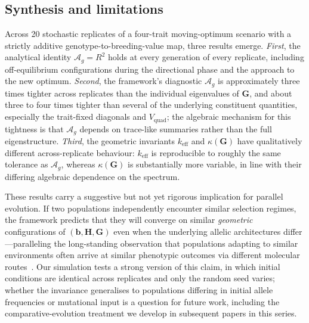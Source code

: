 \documentclass[9pt,twocolumn,twoside,lineno]{gsajnl}
\newcommand{\vect}[1]{\boldsymbol{#1}}
\newcommand{\mat}[1]{\mathbf{#1}}
\newcommand{\Ag}{\ensuremath{\mathcal{A}_{g}}\xspace}
\newcommand{\Vquad}{\ensuremath{V_{\text{quad}}}\xspace}
\newcommand{\keff}{\ensuremath{k_{\mathrm{eff}}}\xspace}
\begin{document}
\subsection*{Synthesis and limitations}

Across 20 stochastic replicates of a four-trait moving-optimum scenario with a strictly additive genotype-to-breeding-value map, three results emerge. \emph{First}, the analytical identity $\Ag = R^2$ holds at every generation of every replicate, including off-equilibrium configurations during the directional phase and the approach to the new optimum. \emph{Second}, the framework's diagnostic \Ag is approximately three times tighter across replicates than the individual eigenvalues of $\mat{G}$, and about three to four times tighter than several of the underlying constituent quantities, especially the trait-fixed diagonals and $\Vquad$; the algebraic mechanism for this tightness is that \Ag depends on trace-like summaries rather than the full eigenstructure. \emph{Third}, the geometric invariants $\keff$ and $\kappa(\mat{G})$ have qualitatively different across-replicate behaviour: \keff is reproducible to roughly the same tolerance as \Ag, whereas $\kappa(\mat{G})$ is substantially more variable, in line with their differing algebraic dependence on the spectrum.

These results carry a suggestive but not yet rigorous implication for parallel evolution. If two populations independently encounter similar selection regimes, the framework predicts that they will converge on similar \emph{geometric} configurations of $(\vect{b},\mat{H},\mat{G})$ even when the underlying allelic architectures differ---paralleling the long-standing observation that populations adapting to similar environments often arrive at similar phenotypic outcomes via different molecular routes~\citep{Schluter1996,Stern2013}. Our simulation tests a strong version of this claim, in which initial conditions are identical across replicates and only the random seed varies; whether the invariance generalises to populations differing in initial allele frequencies or mutational input is a question for future work, including the comparative-evolution treatment we develop in subsequent papers in this series.
\end{document}
